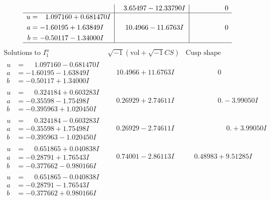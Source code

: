 \documentclass[1p]{elsarticle_modified}
\theoremstyle{definition}
\newcommand{\I}{\sqrt{-1}}
\begin{document}
$$\begin{array}{c|c|c}
 & \phantom{-}3.65497 - 12.33790 I & \phantom{-0.000000 } 0 \\ \hline\begin{aligned}
u &= \phantom{-}1.097160 + 0.681470 I \\
a &= -1.60195 + 1.63849 I \\
b &= -0.50117 - 1.34000 I\end{aligned}
 & \phantom{-}10.4966 - 11.6763 I & \phantom{-0.000000 } 0\\
 \hline 
 \end{array}$$\newpage$$\begin{array}{c|c|c}  
\text{Solutions to }I^u_{1}& \I (\text{vol} + \sqrt{-1}CS) & \text{Cusp shape}\\
 \hline 
\begin{aligned}
u &= \phantom{-}1.097160 - 0.681470 I \\
a &= -1.60195 - 1.63849 I \\
b &= -0.50117 + 1.34000 I\end{aligned}
 & \phantom{-}10.4966 + 11.6763 I & \phantom{-0.000000 } 0 \\ \hline\begin{aligned}
u &= \phantom{-}0.324184 + 0.603283 I \\
a &= -0.35598 - 1.75498 I \\
b &= -0.395963 + 1.020450 I\end{aligned}
 & \phantom{-}0.26929 + 2.74611 I & \phantom{-0.000000 } 0. - 3.99050 I \\ \hline\begin{aligned}
u &= \phantom{-}0.324184 - 0.603283 I \\
a &= -0.35598 + 1.75498 I \\
b &= -0.395963 - 1.020450 I\end{aligned}
 & \phantom{-}0.26929 - 2.74611 I & \phantom{-0.000000 -}0. + 3.99050 I \\ \hline\begin{aligned}
u &= \phantom{-}0.651865 + 0.040838 I \\
a &= -0.28791 + 1.76543 I \\
b &= -0.377662 - 0.980166 I\end{aligned}
 & \phantom{-}0.74001 - 2.86113 I & \phantom{-}0.48983 + 9.51285 I \\ \hline\begin{aligned}
u &= \phantom{-}0.651865 - 0.040838 I \\
a &= -0.28791 - 1.76543 I \\
b &= -0.377662 + 0.980166 I\end{aligned}

\end{array}$$
\end{document}
